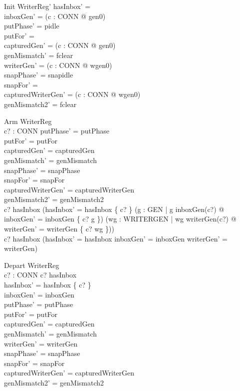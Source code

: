 \documentclass[a4paper,10pt,fleqn]{article}
\begin{document}
\begin{schema}{Init}
  WriterReg'
\where
  hasInbox' = \emptyset \\
  inboxGen' = (\lambda c : CONN @ gen0) \\
  putPhase' = pidle \\
  putFor' = \emptyset \\
  capturedGen' = (\lambda c : CONN @ gen0) \\
  genMismatch' = fclear \\
  writerGen' = (\lambda c : CONN @ wgen0) \\
  snapPhase' = snapidle \\
  snapFor' = \emptyset \\
  capturedWriterGen' = (\lambda c : CONN @ wgen0) \\
  genMismatch2' = fclear
\end{schema}


\begin{schema}{Arm}
  \Delta WriterReg \\
  c? : CONN
\where
  putPhase' = putPhase \\
  putFor' = putFor \\
  capturedGen' = capturedGen \\
  genMismatch' = genMismatch \\
  snapPhase' = snapPhase \\
  snapFor' = snapFor \\
  capturedWriterGen' = capturedWriterGen \\
  genMismatch2' = genMismatch2 \\
  c? \notin hasInbox \implies
    (hasInbox' = hasInbox \cup \{ c? \} \land
     (\exists g : GEN | g \neq inboxGen(c?) @
       inboxGen' = inboxGen \oplus \{ c? \mapsto g \}) \land
     (\exists wg : WRITERGEN | wg \neq writerGen(c?) @
       writerGen' = writerGen \oplus \{ c? \mapsto wg \})) \\
  c? \in hasInbox \implies
    (hasInbox' = hasInbox \land inboxGen' = inboxGen \land writerGen' = writerGen)
\end{schema}

\begin{schema}{Depart}
  \Delta WriterReg \\
  c? : CONN
\where
  c? \in hasInbox \\
  hasInbox' = hasInbox \setminus \{ c? \} \\
  inboxGen' = inboxGen \\
  putPhase' = putPhase \\
  putFor' = putFor \\
  capturedGen' = capturedGen \\
  genMismatch' = genMismatch \\
  writerGen' = writerGen \\
  snapPhase' = snapPhase \\
  snapFor' = snapFor \\
  capturedWriterGen' = capturedWriterGen \\
  genMismatch2' = genMismatch2
\end{schema}
\end{document}

